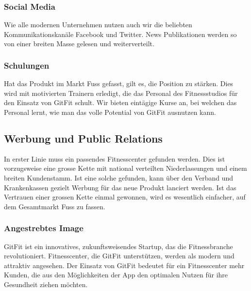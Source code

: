 \subsubsection{Social Media}
Wie alle modernen Unternehmen nutzen auch wir die beliebten
Kommunikationskanäle Facebook und Twitter. News Publikationen werden so
von einer breiten Masse gelesen und weiterverteilt.

\pagebreak
\subsubsection{Schulungen}
Hat das Produkt im Markt Fuss gefasst, gilt es, die Position zu stärken. Dies wird mit motivierten Trainern erledigt, die das Personal des Fitnessstudios für den Einsatz von GitFit schult. Wir bieten eintägige Kurse an, bei welchen das Personal lernt, wie man das volle Potential von GitFit ausnutzen kann.

\clearpage

\subsection{Werbung und Public Relations}
In erster Linie muss ein passendes Fitnesscenter gefunden werden. Dies ist vorzugsweise eine grosse Kette mit national verteilten Niederlassungen und einem breiten Kundenstamm. Ist eine solche gefunden, kann über den Verband und Krankenkassen gezielt Werbung für das neue Produkt lanciert werden. Ist das Vertrauen einer grossen Kette einmal gewonnen, wird es wesentlich einfacher, auf dem Gesamtmarkt Fuss zu fassen.

\subsubsection{Angestrebtes Image}
GitFit ist ein innovatives, zukunftsweisendes Startup, das die Fitnessbranche revolutioniert. Fitnesscenter, die GitFit unterstützen, werden als modern und attraktiv angesehen. Der Einsatz von GitFit bedeutet für ein Fitnesscenter mehr Kunden, die aus den Möglichkeiten der App den optimalen Nutzen für ihre Gesundheit ziehen möchten.

